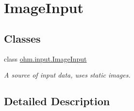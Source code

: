 \hypertarget{group___image_input}{}\section{Image\+Input}
\label{group___image_input}
\subsection*{Classes}
\begin{DoxyCompactItemize}
\item 
class \hyperlink{classohm_1_1input_1_1_image_input}{ohm.\+input.\+Image\+Input}
\begin{DoxyCompactList}\small\item\em A source of input data, uses static images. \end{DoxyCompactList}\end{DoxyCompactItemize}


\subsection{Detailed Description}
